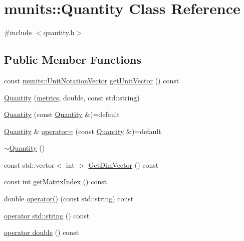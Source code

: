 \hypertarget{classmunits_1_1_quantity}{}\section{munits\+:\+:Quantity Class Reference}
\label{classmunits_1_1_quantity}


{\ttfamily \#include $<$quantity.\+h$>$}

\subsection*{Public Member Functions}
\begin{DoxyCompactItemize}
\item 
const \hyperlink{classmunits_1_1_unit_notation_vector}{munits\+::\+Unit\+Notation\+Vector} \hyperlink{classmunits_1_1_quantity_ad9dadbbab677bf22170412595e65cc2f}{get\+Unit\+Vector} () const
\item 
\hyperlink{classmunits_1_1_quantity_a7b99d99300cfad3056e2b426644531eb}{Quantity} (\hyperlink{namespacemunits_a22c8effe19fdc3eb888884aa217f0c25}{metrics}, double, const std\+::string)
\item 
\hyperlink{classmunits_1_1_quantity_aeeb10868a2ec67f430442182b2690869}{Quantity} (const \hyperlink{classmunits_1_1_quantity}{Quantity} \&)=default
\item 
\hyperlink{classmunits_1_1_quantity}{Quantity} \& \hyperlink{classmunits_1_1_quantity_af77fd9cb9469a6b71c8a27004f5dabe4}{operator=} (const \hyperlink{classmunits_1_1_quantity}{Quantity} \&)=default
\item 
\hyperlink{classmunits_1_1_quantity_a01e795d566b95da5ecbe0f1aa99076d7}{$\sim$\+Quantity} ()
\item 
const std\+::vector$<$ int $>$ \hyperlink{classmunits_1_1_quantity_a3210eda57592da41b8894128bb0d6544}{Get\+Dim\+Vector} () const
\item 
const int \hyperlink{classmunits_1_1_quantity_a9167bbf331462dc79bfd62fec4a90f84}{get\+Matrix\+Index} () const
\item 
double \hyperlink{classmunits_1_1_quantity_ac9e9f65483a14ec729bb684d629091bc}{operator()} (const std\+::string) const
\item 
\hyperlink{classmunits_1_1_quantity_ad5d294ad29bf6faaf64ed1f9b92ba5e0}{operator std\+::string} () const
\item 
\hyperlink{classmunits_1_1_quantity_a57e30283ba53c0e942a1d01fe2061bd7}{operator double} () const
\item 

\end{DoxyCompactItemize}
